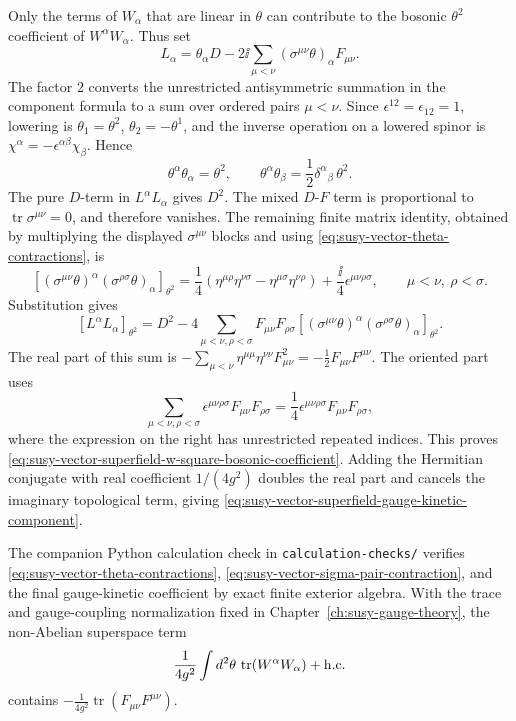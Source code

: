 Only the terms of \(W_\alpha\) that are linear in \(\theta\) can contribute
to the bosonic \(\theta^2\) coefficient of \(W^\alpha W_\alpha\).  Thus set
\[
  L_\alpha
  =
  \theta_\alpha D
  -2\ii\sum_{\mu<\nu}
  (\sigma^{\mu\nu}\theta)_\alpha F_{\mu\nu}.
\]
The factor \(2\) converts the unrestricted antisymmetric summation in the
component formula to a sum over ordered pairs \(\mu<\nu\).  Since
\(\epsilon^{12}=\epsilon_{12}=1\), lowering is
\(\theta_1=\theta^2\), \(\theta_2=-\theta^1\), and the inverse operation on a
lowered spinor is \(\chi^\alpha=-\epsilon^{\alpha\beta}\chi_\beta\).  Hence
\begin{equation}
  \theta^\alpha\theta_\alpha=\theta^2,\qquad
  \theta^\alpha\theta_\beta=\frac12\delta^\alpha{}_\beta\,\theta^2 .
  \label{eq:susy-vector-theta-contractions}
\end{equation}
The pure \(D\)-term in \(L^\alpha L_\alpha\) gives \(D^2\).  The mixed
\(D\)-\(F\) term is proportional to
\(\operatorname{tr}\sigma^{\mu\nu}=0\), and therefore vanishes.  The remaining
finite matrix identity, obtained by multiplying the displayed
\(\sigma^{\mu\nu}\) blocks and using
\eqref{eq:susy-vector-theta-contractions}, is
\begin{equation}
  \left[
    (\sigma^{\mu\nu}\theta)^\alpha
    (\sigma^{\rho\sigma}\theta)_\alpha
  \right]_{\theta^2}
  =
  \frac14\left(
  \eta^{\mu\rho}\eta^{\nu\sigma}
  -\eta^{\mu\sigma}\eta^{\nu\rho}\right)
  +\frac{\ii}{4}\epsilon^{\mu\nu\rho\sigma},
  \qquad \mu<\nu,\ \rho<\sigma .
  \label{eq:susy-vector-sigma-pair-contraction}
\end{equation}
Substitution gives
\[
  [L^\alpha L_\alpha]_{\theta^2}
  =
  D^2
  -4\sum_{\mu<\nu,\rho<\sigma}
  F_{\mu\nu}F_{\rho\sigma}
  \left[
    (\sigma^{\mu\nu}\theta)^\alpha
    (\sigma^{\rho\sigma}\theta)_\alpha
  \right]_{\theta^2}.
\]
The real part of this sum is
\(-\sum_{\mu<\nu}\eta^{\mu\mu}\eta^{\nu\nu}F_{\mu\nu}^2
=-\frac12F_{\mu\nu}F^{\mu\nu}\).  The oriented part uses
\[
  \sum_{\mu<\nu,\rho<\sigma}
  \epsilon^{\mu\nu\rho\sigma}F_{\mu\nu}F_{\rho\sigma}
  =
  \frac14
  \epsilon^{\mu\nu\rho\sigma}F_{\mu\nu}F_{\rho\sigma},
\]
where the expression on the right has unrestricted repeated indices.  This
proves \eqref{eq:susy-vector-superfield-w-square-bosonic-coefficient}.
Adding the Hermitian conjugate with real coefficient \(1/(4g^2)\) doubles
the real part and cancels the imaginary topological term, giving
\eqref{eq:susy-vector-superfield-gauge-kinetic-component}.

The companion Python calculation check in \texttt{calculation-checks/}
verifies
\eqref{eq:susy-vector-theta-contractions},
\eqref{eq:susy-vector-sigma-pair-contraction}, and the final
gauge-kinetic coefficient by exact finite exterior algebra.  With the trace
and gauge-coupling normalization fixed in
Chapter~\ref{ch:susy-gauge-theory}, the non-Abelian superspace term
\[
  \frac{1}{4g^2}\int d^2\theta\,\operatorname{tr}(W^\alpha W_\alpha)
  +{\rm h.c.}
\]
contains
\(-\frac{1}{4g^2}\operatorname{tr}(F_{\mu\nu}F^{\mu\nu})\).

